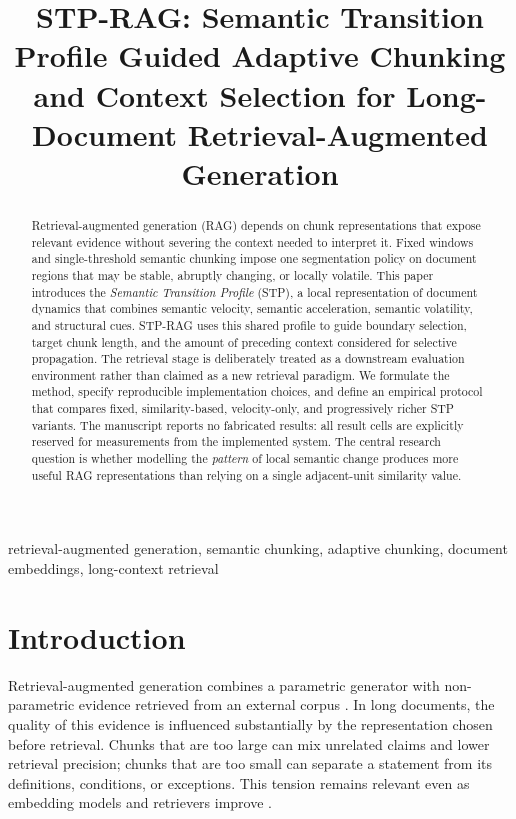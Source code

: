 \documentclass[conference]{IEEEtran}
\title{STP-RAG: Semantic Transition Profile Guided Adaptive Chunking and Context Selection for Long-Document Retrieval-Augmented Generation}
\author{\IEEEauthorblockN{Author Name 1, Author Name 2, and Author Name 3}
\IEEEauthorblockA{Department of Computer Science and Engineering\\
Institution Name, City, Country\\
\{author1, author2, author3\}@example.edu}}
\begin{document}
\maketitle

\begin{abstract}
Retrieval-augmented generation (RAG) depends on chunk representations that expose relevant evidence without severing the context needed to interpret it. Fixed windows and single-threshold semantic chunking impose one segmentation policy on document regions that may be stable, abruptly changing, or locally volatile. This paper introduces the \emph{Semantic Transition Profile} (STP), a local representation of document dynamics that combines semantic velocity, semantic acceleration, semantic volatility, and structural cues. STP-RAG uses this shared profile to guide boundary selection, target chunk length, and the amount of preceding context considered for selective propagation. The retrieval stage is deliberately treated as a downstream evaluation environment rather than claimed as a new retrieval paradigm. We formulate the method, specify reproducible implementation choices, and define an empirical protocol that compares fixed, similarity-based, velocity-only, and progressively richer STP variants. The manuscript reports no fabricated results: all result cells are explicitly reserved for measurements from the implemented system. The central research question is whether modelling the \emph{pattern} of local semantic change produces more useful RAG representations than relying on a single adjacent-unit similarity value.
\end{abstract}

\begin{IEEEkeywords}
retrieval-augmented generation, semantic chunking, adaptive chunking, document embeddings, long-context retrieval
\end{IEEEkeywords}

\section{Introduction}
Retrieval-augmented generation combines a parametric generator with non-parametric evidence retrieved from an external corpus \parencite{lewis2020retrieval}. In long documents, the quality of this evidence is influenced substantially by the representation chosen before retrieval. Chunks that are too large can mix unrelated claims and lower retrieval precision; chunks that are too small can separate a statement from its definitions, conditions, or exceptions. This tension remains relevant even as embedding models and retrievers improve \parencite{karpukhin2020dense,gao2024retrieval}.
\end{document}
